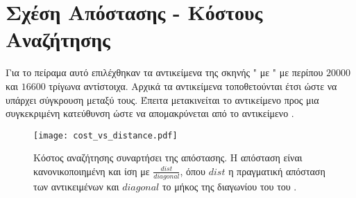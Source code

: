 \section{Σχέση Απόστασης - Κόστους Αναζήτησης}
Για το πείραμα αυτό επιλέχθηκαν τα αντικείμενα της σκηνής 
" με " με περίπου $20000$ 
και $16600$ τρίγωνα αντίστοιχα.
Αρχικά τα αντικείμενα τοποθετούνται έτσι ώστε να υπάρχει 
σύγκρουση μεταξύ τους.
Έπειτα μετακινείται το αντικείμενο  
προς μια συγκεκριμένη κατεύθυνση ώστε να απομακρύνεται 
από το αντικείμενο .

\begin{figure}[H]
    \centering
    \texttt{[image: cost\_vs\_distance.pdf]}
    \caption[Κόστος Αναζήτησης Συναρτήσει της Απόστασης"] {
        Κόστος αναζήτησης συναρτήσει της απόστασης.
        Η απόσταση είναι κανονικοποιημένη και ίση με 
        $\frac{dist}{diagonal}$, όπου $dist$ η πραγματική 
        απόσταση των αντικειμένων και $diagonal$ το μήκος 
        της διαγωνίου του  του .
    }
\end{figure}


